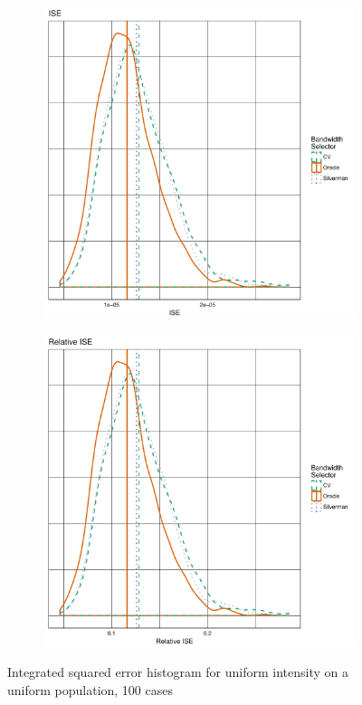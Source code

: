 \begin{figure}[htbp]
    \centering
    \begin{subfigure}[b]{0.45\textwidth}
    \includegraphics[width=\textwidth]{results/unif_100_unif/output/ise-histogram}
    \label{fig:ise:unif_100_unif:absolute}
    \end{subfigure}
    \begin{subfigure}[b]{0.45\textwidth}
    \includegraphics[width=\textwidth]{results/unif_100_unif/output/ise-relative-histogram}
    \label{fig:ise:unif_100_unif:relative}
    \end{subfigure}
    \caption[ISE: uniform on uniform]{Integrated squared error histogram for uniform intensity on a uniform population, 100 cases}
    \label{fig:ise:unif_100_unif}
\end{figure}

